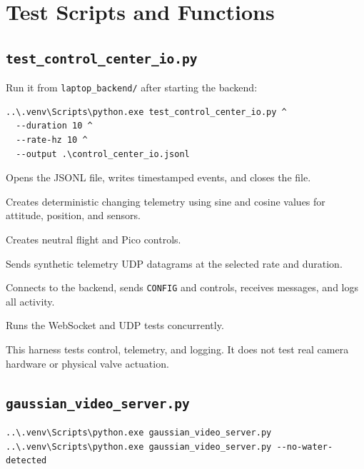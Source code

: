 \documentclass[11pt]{article}
\begin{document}
\section{Test Scripts and Functions}

\subsection{\texttt{test\_control\_center\_io.py}}

Run it from \texttt{laptop\_backend/} after starting the backend:

\begin{lstlisting}
..\.venv\Scripts\python.exe test_control_center_io.py ^
  --duration 10 ^
  --rate-hz 10 ^
  --output .\control_center_io.jsonl
\end{lstlisting}

\begin{description}[leftmargin=!,labelwidth=0.28\textwidth]
\item[\texttt{EventLog}] Opens the JSONL file, writes timestamped events, and
closes the file.
\item[\texttt{telemetry\_packet}] Creates deterministic changing telemetry
using sine and cosine values for attitude, position, and sensors.
\item[\texttt{control\_packet}] Creates neutral flight and Pico controls.
\item[\texttt{send\_telemetry}] Sends synthetic telemetry UDP datagrams at
the selected rate and duration.
\item[\texttt{exercise\_websocket}] Connects to the backend, sends
\texttt{CONFIG} and controls, receives messages, and logs all activity.
\item[\texttt{run}] Runs the WebSocket and UDP tests concurrently.
\end{description}

This harness tests control, telemetry, and logging. It does not test real
camera hardware or physical valve actuation.

\subsection{\texttt{gaussian\_video\_server.py}}

\begin{lstlisting}
..\.venv\Scripts\python.exe gaussian_video_server.py
..\.venv\Scripts\python.exe gaussian_video_server.py --no-water-detected
\end{lstlisting}
\end{document}
